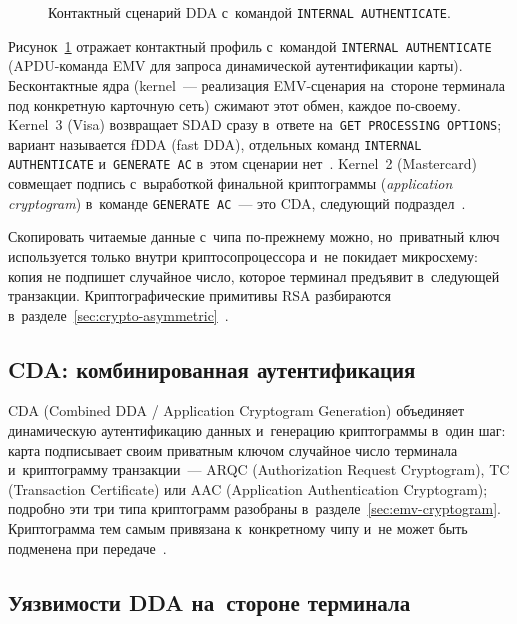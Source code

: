 \begin{figure}[tbp]
  \centering
  \caption{Контактный сценарий DDA с~командой \texttt{INTERNAL AUTHENTICATE}.}\label{fig:emv-dda-sequence}
\end{figure}

\noindent Рисунок~\ref{fig:emv-dda-sequence} отражает контактный профиль
с~командой \texttt{INTERNAL AUTHENTICATE} (APDU-команда EMV для запроса
динамической аутентификации карты). Бесконтактные ядра (kernel~---
реализация EMV-сценария на~стороне терминала под конкретную карточную сеть)
сжимают этот обмен, каждое по-своему. Kernel~3 (Visa) возвращает SDAD сразу
в~ответе на~\texttt{GET PROCESSING OPTIONS}; вариант называется fDDA
(fast DDA), отдельных команд \texttt{INTERNAL AUTHENTICATE}
и~\texttt{GENERATE AC} в~этом сценарии нет~\cite{emvco-contactless-book-c3}.
Kernel~2 (Mastercard) совмещает подпись с~выработкой финальной криптограммы
(\textit{application cryptogram}) в~команде \texttt{GENERATE AC}~--- это CDA,
следующий подраздел~\cite{emvco-contactless-book-c2}.

Скопировать читаемые данные с~чипа по-прежнему можно, но~приватный ключ
используется только внутри криптосопроцессора и~не покидает микросхему: копия
не подпишет случайное число, которое терминал предъявит в~следующей транзакции.
Криптографические примитивы RSA разбираются
в~разделе~\ref{sec:crypto-asymmetric}~\cite{emvco-book2}.

\subsection*{CDA: комбинированная аутентификация}

CDA (Combined DDA / Application Cryptogram Generation) объединяет динамическую
аутентификацию данных и~генерацию криптограммы в~один шаг: карта подписывает
своим приватным ключом случайное число терминала и~криптограмму транзакции~---
ARQC (Authorization Request Cryptogram), TC
(Transaction Certificate) или AAC (Application Authentication Cryptogram);
подробно эти три типа криптограмм разобраны в~разделе~\ref{sec:emv-cryptogram}.
Криптограмма тем самым привязана к~конкретному чипу и~не может быть подменена
при передаче~\cite{emvco-book2}.

\subsection*{Уязвимости DDA на~стороне терминала}

